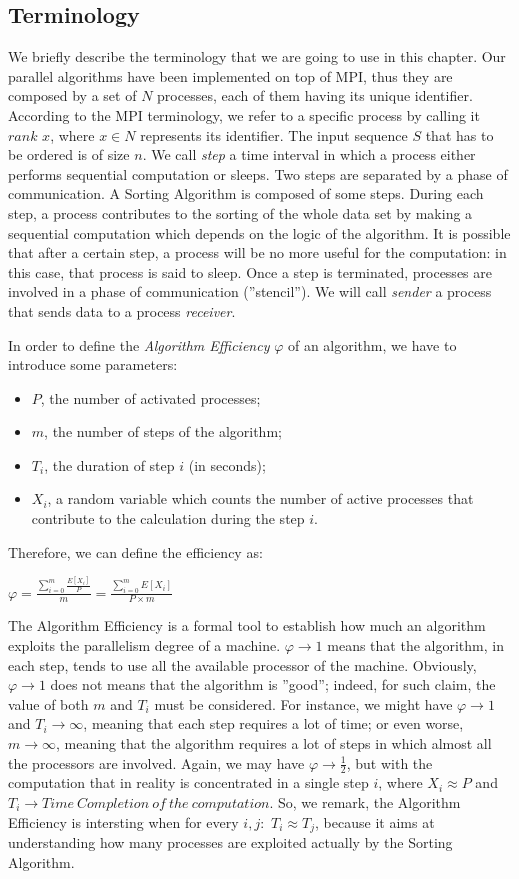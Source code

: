 \label{terminology}
\subsection*{Terminology}
We briefly describe the terminology that we are going to use in this chapter. Our parallel algorithms have been implemented on top of MPI, thus they are composed by a set of $N$ processes, each of them having its unique identifier. According to the MPI terminology, we refer to a specific process by calling it $rank$ $x$, where $x \in N$ represents its identifier. The input sequence $S$ that has to be ordered is of size $n$. We call \textit{step} a time interval in which a process either performs sequential computation or sleeps. Two steps are separated by a phase of communication. A Sorting Algorithm is composed of some steps. During each step, a process contributes to the sorting of the whole data set by making a sequential computation which depends on the logic of the algorithm. It is possible that after a certain step, a process will be no more useful for the computation: in this case, that process is said to sleep. Once a step is terminated, processes are involved in a phase of communication (''stencil''). We will call \textit{sender} a process that sends data to a process \textit{receiver}.

In order to define the \textit{Algorithm Efficiency} $\varphi$ of an algorithm, we have to introduce some parameters:
\begin{itemize}
\item $P$, the number of activated processes; 
\item $m$, the number of steps of the algorithm;
\item $T_i$, the duration of step $i$ (in seconds);
\item $X_i$, a random variable which counts the number of active processes that contribute to the calculation during the step $i$.
\end{itemize}
Therefore, we can define the efficiency as:
\begin{center}
$\varphi = \frac{\sum_{i=0}^m \frac{E[X_i]}{P}}{m} = \frac{\sum_{i=0}^m E[X_i]}{P \times m} $
\end{center}
The Algorithm Efficiency is a formal tool to establish how much an algorithm exploits the parallelism degree of a machine. $\varphi \rightarrow 1$ means that the algorithm, in each step, tends to use all the available processor of the machine. Obviously, $\varphi \rightarrow 1$ does not means that the algorithm is ''good''; indeed, for such claim, the value of both $m$ and $T_i$ must be considered. For instance, we might have $\varphi \rightarrow 1$ and $T_i \rightarrow\infty$, meaning that each step requires a lot of time; or even worse, $m \rightarrow\infty$, meaning that the algorithm requires a lot of steps in which almost all the processors are involved. Again, we may have $\varphi \rightarrow \frac{1}{2}$, but with the computation that in reality is concentrated in a single step $i$, where $X_i \approx P$ and $T_i \rightarrow Time\ Completion\ of\ the\ computation$. So, we remark, the Algorithm Efficiency is intersting when for every $i, j:$ $T_i \approx T_j$, because it aims at understanding how many processes are exploited actually by the Sorting Algorithm.


